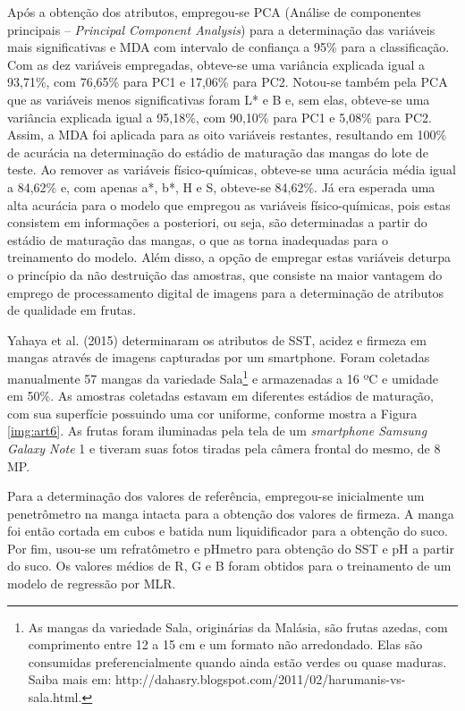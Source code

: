 Após a obtenção dos atributos, empregou-se PCA (Análise de componentes principais – \textit{Principal Component Analysis}) para a determinação das variáveis mais significativas e MDA com intervalo de confiança a 95\% para a classificação. Com as dez variáveis empregadas, obteve-se uma variância explicada igual a 93,71\%, com 76,65\% para PC1 e 17,06\% para PC2. Notou-se também pela PCA que as variáveis menos significativas foram L* e B e, sem elas, obteve-se uma variância explicada igual a 95,18\%, com 90,10\% para PC1 e 5,08\% para PC2. Assim, a MDA foi aplicada para as oito variáveis restantes, resultando em 100\% de acurácia na determinação do estádio de maturação das mangas do lote de teste. Ao remover as variáveis físico-químicas, obteve-se uma acurácia média igual a 84,62\% e, com apenas a*, b*, H e S, obteve-se 84,62\%. Já era esperada uma alta acurácia para o modelo que empregou as variáveis físico-químicas, pois estas consistem em informações a posteriori, ou seja, são determinadas a partir do estádio de maturação das mangas, o que as torna inadequadas para o treinamento do modelo. Além disso, a opção de empregar estas variáveis deturpa o princípio da não destruição das amostras, que consiste na maior vantagem do emprego de processamento digital de imagens para a determinação de atributos de qualidade em frutas. 

Yahaya et al. (2015) determinaram os atributos de SST, acidez e firmeza em mangas através de imagens capturadas por um smartphone. Foram coletadas manualmente 57 mangas da variedade Sala\footnote{\label{ftnote:sala}As mangas da variedade Sala, originárias da Malásia, são frutas azedas, com comprimento entre 12 a 15 cm e um formato não arredondado. Elas são consumidas preferencialmente quando ainda estão verdes ou quase maduras. Saiba mais em: http://dahasry.blogspot.com/2011/02/harumanis-vs-sala.html.} e armazenadas a 16 ºC e umidade em 50\%. As amostras coletadas estavam em diferentes estádios de maturação, com sua superfície possuindo uma cor uniforme, conforme mostra a Figura \ref{img:art6}. As frutas foram iluminadas pela tela de um \textit{smartphone Samsung Galaxy Note} 1 e tiveram suas fotos tiradas pela câmera frontal do mesmo, de 8 MP. 


Para a determinação dos valores de referência, empregou-se inicialmente um penetrômetro na manga intacta para a obtenção dos valores de firmeza. A manga foi então cortada em cubos e batida num liquidificador para a obtenção do suco. Por fim, usou-se um refratômetro e pHmetro para obtenção do SST e pH a partir do suco. Os valores médios de R, G e B foram obtidos para o treinamento de um modelo de regressão por MLR.

